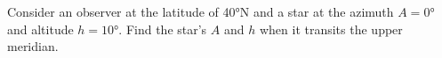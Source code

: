 \documentclass[main.tex]{subfiles}
\begin{document}
\begin{q}{2}
Consider an observer at the latitude of \ang{40}N and a star at the azimuth $A = \ang{0}$ and altitude $h = \ang{10}$. Find the star's $A$ and $h$ when it transits the upper meridian.
\end{q}

\begin{sol}

\end{sol}
\end{document}

